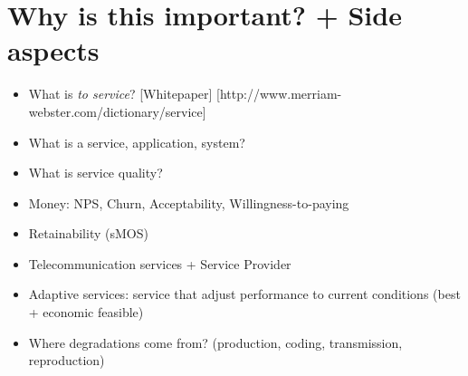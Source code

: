 \section{Why is this important? + Side aspects}
\begin{itemize}
\item What is \emph{to service}? [Whitepaper] [http://www.merriam-webster.com/dictionary/service]
\item What is a service, application, system?
\item What is service quality?
\item Money: NPS, Churn, Acceptability, Willingness-to-paying
\item Retainability (sMOS)
\item Telecommunication services + Service Provider
\item Adaptive services: service that adjust performance to current conditions (best + economic feasible)
\item Where degradations come from? (production, coding, transmission, reproduction)
\end{itemize}
